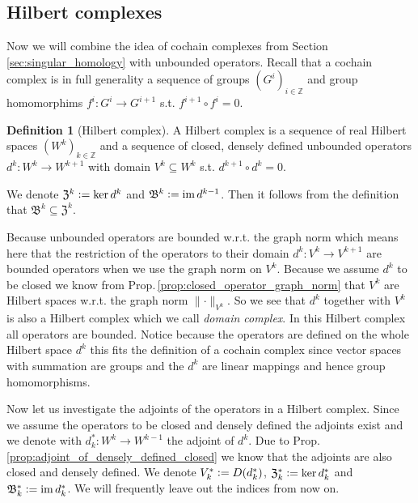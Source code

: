 \documentclass[12pt,a4paper]{article}
\numberwithin{equation}{subsection}
\numberwithin{lemma}{subsection}
\theoremstyle{definition}
\newtheorem{definition}[lemma]{Definition}
\DeclareMathOperator{\Ima}{im}
\newcommand{\integers}{\mathbb{Z}}
\begin{document}
\subsection{Hilbert complexes}

Now we will combine the idea of cochain complexes from Section 
\ref{sec:singular_homology} 
with unbounded operators. Recall that a cochain complex 
is in full generality a sequence of groups $(G^i)_{i\in \integers}$ 
and group homomorphims $f^i: G^i \rightarrow G^{i+1}$ s.t. 
$f^{i+1} \circ f^{i} = 0$.

\begin{definition}[Hilbert complex]
    A Hilbert complex is a sequence of real Hilbert spaces $(W^k)_{k\in \integers}$
    and a sequence of closed, densely defined 
    unbounded operators $d^k: W^k \rightarrow W^{k+1}$ with domain
    $V^k \subseteq W^k$ s.t. $d^{k+1} \circ d^k = 0$.
\end{definition}
\noindent We denote $\mathfrak{Z}^k  \vcentcolon= \ker d^k$ and $\mathfrak{B}^k 
\vcentcolon= \Ima d^{k-1}$. Then it follows from the definition that
$\mathfrak{B}^k \subseteq \mathfrak{Z}^k$.

Because unbounded operators are bounded w.r.t. the graph norm
which means here that the restriction of the operators to their domain 
$d^k: V^k \rightarrow V^{k+1}$ are bounded operators when we use the graph norm
on $V^k$. 
Because we assume $d^k$ to be 
closed we know from Prop.\,\ref{prop:closed_operator_graph_norm}
that $V^k$ are Hilbert spaces w.r.t. the graph norm $\lVert \cdot \rVert _{V^k}$.
So we see that $d^k$ together with $V^k$ is also a Hilbert complex which 
we call \textit{domain complex}. In this Hilbert complex all operators are 
bounded. Notice because the operators are defined on the whole Hilbert space 
$d^k$ this fits the definition of a cochain complex since vector spaces 
with summation
are groups and the $d^k$ are linear mappings and hence group homomorphisms.

Now let us investigate the adjoints of the operators in a Hilbert complex.
Since we assume the operators to be closed and densely defined the adjoints 
exist and we denote with $d_k^*:W^k \rightarrow W^{k-1}$ the adjoint of $d^k$.
Due to Prop.\,\ref{prop:adjoint_of_densely_defined_closed} we know that the 
adjoints are also closed and densely defined. We denote 
$V_k^* \vcentcolon= D(d_k^*)$, $\mathfrak{Z}^*_k \vcentcolon= \ker d^*_k$ 
and $\mathfrak{B}^*_k \vcentcolon= \Ima d^*_k$. We will frequently leave out 
the indices from now on.
\end{document}
